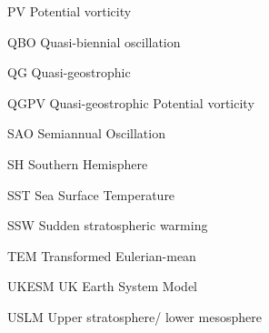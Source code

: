 \begin{description*}
\item[PV] Potential vorticity
\item[QBO] Quasi-biennial oscillation
\item[QG] Quasi-geostrophic
\item[QGPV] Quasi-geostrophic Potential vorticity
\item[SAO] Semiannual Oscillation
\item[SH] Southern Hemisphere
\item[SST] Sea Surface Temperature
\item[SSW] Sudden stratospheric warming
\item[TEM] Transformed Eulerian-mean
\item[UKESM] UK Earth System Model
\item[USLM] Upper stratosphere/ lower mesosphere



\end{description*}



